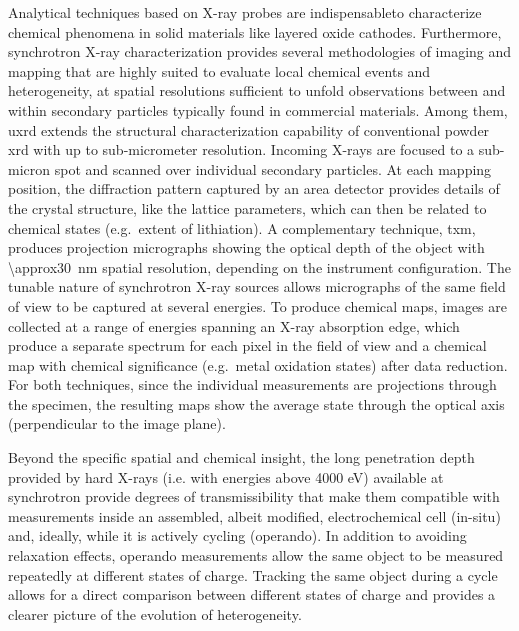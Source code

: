 \documentclass{article}
\begin{document}
Analytical techniques based on X-ray probes are indispensableto characterize chemical phenomena in solid materials like layered oxide cathodes.\cite{doeff2017} Furthermore, synchrotron X-ray characterization provides several methodologies of imaging and mapping that are highly suited to
evaluate local chemical events and heterogeneity, at spatial resolutions sufficient to unfold observations between and within secondary particles typically found in commercial materials. Among them, \Gls{uxrd} extends the
structural characterization capability of conventional powder \gls{xrd} with
up to sub-micrometer resolution. Incoming X-rays are focused to a
sub-micron spot and scanned over individual secondary particles. At
each mapping position, the diffraction pattern captured by an area
detector provides details of the crystal structure, like the lattice
parameters, which can then be related to chemical states (e.g.\ extent
of lithiation). A complementary technique, \Gls{txm}, produces
projection micrographs showing the optical depth of the object with
\SI{\approx30}{nm} spatial resolution, depending on the instrument
configuration. The tunable nature of synchrotron X-ray sources allows
micrographs of the same field of view to be captured at several
energies. To produce chemical maps, images are collected at a range of
energies spanning an X-ray absorption edge, which produce a separate
spectrum for each pixel in the field of view and a chemical map with
chemical significance (e.g.\ metal oxidation states) after data
reduction. For both techniques, since the individual measurements are
projections through the specimen, the resulting maps show the average
state through the optical axis (perpendicular to the image plane).

Beyond the specific spatial and chemical insight, the long penetration depth provided by hard X-rays (i.e. with energies above 4000 eV) available at synchrotron provide degrees of transmissibility that make them compatible with measurements inside an assembled, albeit modified, electrochemical cell (in-situ) and, ideally,
while it is actively cycling (operando). In addition to avoiding
relaxation effects, operando measurements allow the same object to be
measured repeatedly at different states of charge. Tracking the same
object during a cycle allows for a direct comparison
between different states of charge and provides a clearer picture of
the evolution of heterogeneity.


\end{document}
